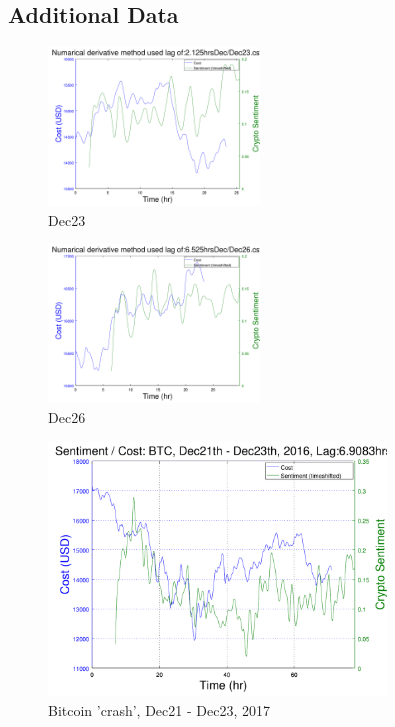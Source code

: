 \documentclass[12pt,journal,compsoc]{IEEEtran}
\begin{document}
\subsection{Additional Data}

\begin{figure}[h!]
	\centering
	\includegraphics[width=0.5\textwidth]{../Datasets/Plots/Dec23}
	\caption{Dec23}
	\label{fig:Dec23}
\end{figure}

\begin{figure}[h!]
	\centering
	\includegraphics[width=0.5\textwidth]{../Datasets/Plots/Dec26}
	\caption{Dec26}
	\label{fig:Dec26}
\end{figure}

\begin{figure}[h!]
	\centering
	\includegraphics[width=0.8\textwidth]{../Datasets/Plots/Dec21-23}
	\caption{Bitcoin 'crash', Dec21 - Dec23, 2017}
	\label{fig:Dec21-23}
\end{figure}
\end{document}
